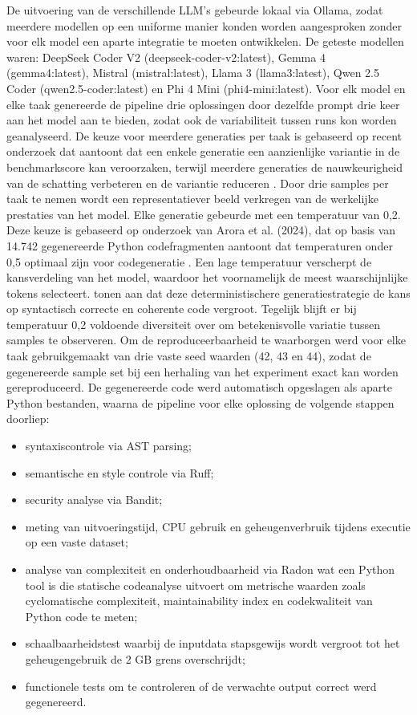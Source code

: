 De uitvoering van de verschillende LLM's gebeurde lokaal via Ollama, zodat meerdere modellen op een uniforme manier konden worden aangesproken zonder voor elk model een aparte integratie te moeten ontwikkelen. De geteste modellen waren: DeepSeek Coder V2 (deepseek-coder-v2:latest), Gemma 4 (gemma4:latest), Mistral (mistral:latest), Llama 3 (llama3:latest), Qwen 2.5 Coder (qwen2.5-coder:latest) en Phi 4 Mini (phi4-mini:latest). Voor elk model en elke taak genereerde de pipeline drie oplossingen door dezelfde prompt drie keer aan het model aan te bieden, zodat ook de variabiliteit tussen runs kon worden geanalyseerd. De keuze voor meerdere generaties per taak is gebaseerd op recent onderzoek dat aantoont dat een enkele generatie een aanzienlijke variantie in de benchmarkscore kan veroorzaken, terwijl meerdere generaties de nauwkeurigheid van de schatting verbeteren en de variantie reduceren \autocite{Zhang2026}. Door drie samples per taak te nemen wordt een representatiever beeld verkregen van de werkelijke prestaties van het model. Elke generatie gebeurde met een temperatuur van 0,2. Deze keuze is gebaseerd op onderzoek van Arora et al. (2024), dat op basis van 14.742 gegenereerde Python codefragmenten aantoont dat temperaturen onder 0,5 optimaal zijn voor codegeneratie \autocite{Arora2024}. Een lage temperatuur verscherpt de kansverdeling van het model, waardoor het voornamelijk de meest waarschijnlijke tokens selecteert. \textcite{Chen2021} tonen aan dat deze deterministischere generatiestrategie de kans op syntactisch correcte en coherente code vergroot. Tegelijk blijft er bij temperatuur 0,2 voldoende diversiteit over om betekenisvolle variatie tussen samples te observeren. Om de reproduceerbaarheid te waarborgen werd voor elke taak gebruikgemaakt van drie vaste seed waarden (42, 43 en 44), zodat de gegenereerde sample set bij een herhaling van het experiment exact kan worden gereproduceerd. De gegenereerde code werd automatisch opgeslagen als aparte Python bestanden, waarna de pipeline voor elke oplossing de volgende stappen doorliep:

\begin{itemize}
\item syntaxiscontrole via AST parsing;
\item semantische en style controle via Ruff;
\item security analyse via Bandit;
\item meting van uitvoeringstijd, CPU gebruik en geheugenverbruik tijdens executie op een vaste dataset;
\item analyse van complexiteit en onderhoudbaarheid via Radon wat een Python tool is die statische codeanalyse uitvoert om metrische waarden zoals cyclomatische complexiteit, maintainability index en codekwaliteit van Python code te meten;
\item schaalbaarheidstest waarbij de inputdata stapsgewijs wordt vergroot tot het geheugengebruik de 2 GB grens overschrijdt;
\item functionele tests om te controleren of de verwachte output correct werd gegenereerd.
\end{itemize}

